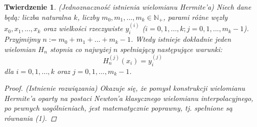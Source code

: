 \documentclass[10pt,wide]{mwart}
\newtheorem{tw}{Twierdzenie}
\theoremstyle{definition}
\begin{document}
\begin{tw} (Jednoznaczność istnienia wielomianu Hermite'a)
Niech dane będą: liczba naturalna \(k\), liczby \(m_0, m_1, ..., m_k \in \mathbb{N}_+\), parami różne węzły \(x_0, x_1, ..., x_k\) oraz wielkości rzeczywiste \(y_i^{(i)}\) (\(i = 0,1,...,k; j = 0,1,...,m_k - 1\)). Przyjmijmy \(n := m_0 + m_1 + ... + m_k - 1 \). Wtedy istnieje dokładnie jeden wielomian \(H_n\) stopnia co najwyżej \(n\) spełniający następujące warunki:
\begin{equation}
H_n^{(j)}(x_i) = y_i^{(j)}
\end{equation}
dla \(i = 0, 1, ..., k\) oraz \(j = 0, 1, ..., m_k - 1\).
\begin{proof} (Istnienie rozwiązania)
  Okazuje się, że pomysł konstrukcji wielomianu Hermite'a oparty na postaci Newton'a klasycznego wielomianu interpolacyjnego, po pewnych uogólnieniach, jest matematycznie poprawny, tj. spełnione są równania (1).


\end{proof}
\end{tw}
\end{document}
